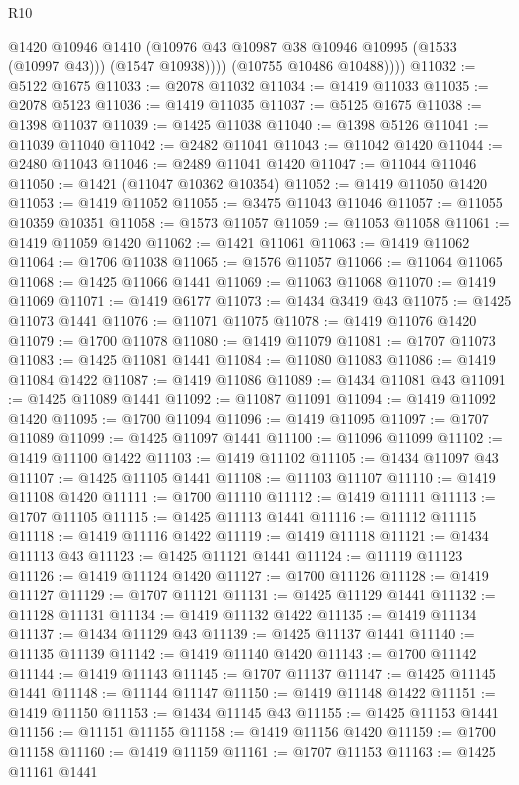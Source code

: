 \begin{lexlean}{R10}
\begin{coremodule}
                @1420
                @10946
                @1410
                (@10976 @43 @10987 @38 @10946 @10995 (@1533 (@10997 @43)))
                (@1547 @10938))))
          (@10755 @10486 @10488))))
@11032 := @5122 @1675
@11033 := @2078 @11032
@11034 := @1419 @11033
@11035 := @2078 @5123
@11036 := @1419 @11035
@11037 := @5125 @1675
@11038 := @1398 @11037
@11039 := @1425 @11038
@11040 := @1398 @5126
@11041 := @11039 @11040
@11042 := @2482 @11041
@11043 := @11042 @1420
@11044 := @2480 @11043
@11046 := @2489 @11041 @1420
@11047 := @11044 @11046
@11050 := @1421 (@11047 @10362 @10354)
@11052 := @1419 @11050 @1420
@11053 := @1419 @11052
@11055 := @3475 @11043 @11046
@11057 := @11055 @10359 @10351
@11058 := @1573 @11057
@11059 := @11053 @11058
@11061 := @1419 @11059 @1420
@11062 := @1421 @11061
@11063 := @1419 @11062
@11064 := @1706 @11038
@11065 := @1576 @11057
@11066 := @11064 @11065
@11068 := @1425 @11066 @1441
@11069 := @11063 @11068
@11070 := @1419 @11069
@11071 := @1419 @6177
@11073 := @1434 @3419 @43
@11075 := @1425 @11073 @1441
@11076 := @11071 @11075
@11078 := @1419 @11076 @1420
@11079 := @1700 @11078
@11080 := @1419 @11079
@11081 := @1707 @11073
@11083 := @1425 @11081 @1441
@11084 := @11080 @11083
@11086 := @1419 @11084 @1422
@11087 := @1419 @11086
@11089 := @1434 @11081 @43
@11091 := @1425 @11089 @1441
@11092 := @11087 @11091
@11094 := @1419 @11092 @1420
@11095 := @1700 @11094
@11096 := @1419 @11095
@11097 := @1707 @11089
@11099 := @1425 @11097 @1441
@11100 := @11096 @11099
@11102 := @1419 @11100 @1422
@11103 := @1419 @11102
@11105 := @1434 @11097 @43
@11107 := @1425 @11105 @1441
@11108 := @11103 @11107
@11110 := @1419 @11108 @1420
@11111 := @1700 @11110
@11112 := @1419 @11111
@11113 := @1707 @11105
@11115 := @1425 @11113 @1441
@11116 := @11112 @11115
@11118 := @1419 @11116 @1422
@11119 := @1419 @11118
@11121 := @1434 @11113 @43
@11123 := @1425 @11121 @1441
@11124 := @11119 @11123
@11126 := @1419 @11124 @1420
@11127 := @1700 @11126
@11128 := @1419 @11127
@11129 := @1707 @11121
@11131 := @1425 @11129 @1441
@11132 := @11128 @11131
@11134 := @1419 @11132 @1422
@11135 := @1419 @11134
@11137 := @1434 @11129 @43
@11139 := @1425 @11137 @1441
@11140 := @11135 @11139
@11142 := @1419 @11140 @1420
@11143 := @1700 @11142
@11144 := @1419 @11143
@11145 := @1707 @11137
@11147 := @1425 @11145 @1441
@11148 := @11144 @11147
@11150 := @1419 @11148 @1422
@11151 := @1419 @11150
@11153 := @1434 @11145 @43
@11155 := @1425 @11153 @1441
@11156 := @11151 @11155
@11158 := @1419 @11156 @1420
@11159 := @1700 @11158
@11160 := @1419 @11159
@11161 := @1707 @11153
@11163 := @1425 @11161 @1441

\end{coremodule}
\end{lexlean}
